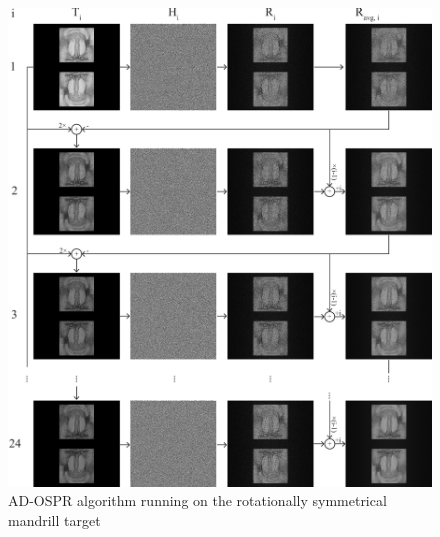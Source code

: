 \begin{figure}[H]
	\centering
	\includegraphics[width=1.0\textwidth]{adospr_mandrill_2.pdf}
	\caption{AD-OSPR algorithm running on the rotationally symmetrical mandrill target}
	\label{fig:adospr_mandrill_2}
\end{figure}

